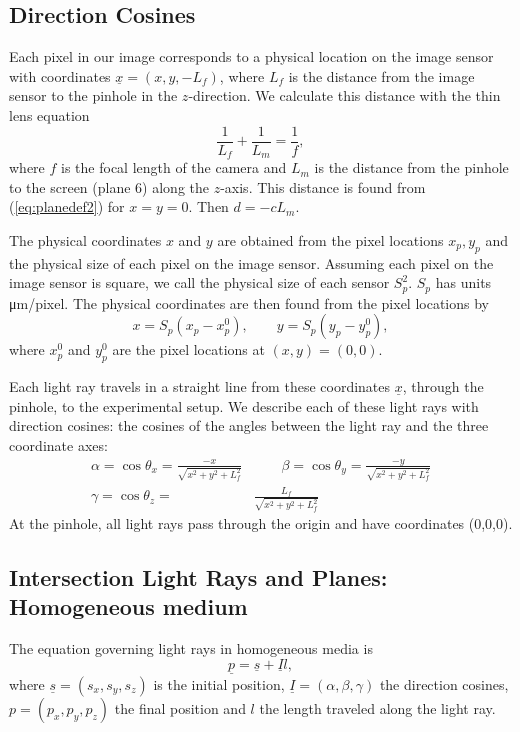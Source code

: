 \documentclass{svjour3}                     %
\begin{document}
\subsection{Direction Cosines}
Each pixel in our image corresponds to a physical location on the image sensor with coordinates $\underline{x} = (x,y, -L_f)$, where $L_f$ is the distance from the image sensor to the pinhole in the $z$-direction. We calculate this distance with the thin lens equation
\begin{equation}
 \frac{1}{L_f} + \frac{1}{L_m} = \frac{1}{f},
\end{equation}
where $f$ is the focal length of the camera and $L_m$ is the distance from the pinhole to the screen (plane 6) along the $z$-axis. This distance is found from (\ref{eq:planedef2}) for $x=y=0$. Then $d = - c L_m$.

The physical coordinates $x$ and $y$ are obtained from the pixel locations $x_p, y_p$  and the physical size of each pixel on the image sensor. Assuming each pixel on the image sensor is square, we call the physical size of each sensor $S_p^2$. $S_p$ has units \si[per-mode=symbol]{\micro\metre\per pixel}. The physical coordinates are then found from the pixel locations by %
\begin{equation}
	x = S_p (x_p-x_p^0), \qquad  y = S_p (y_p-y_p^0),
\end{equation}
where $x_p^0$ and $y_p^0$ are the pixel locations at $(x,y)=(0,0)$.

Each light ray travels in a straight line from these coordinates $\underline{x}$, through the pinhole, to the experimental setup. We describe each of these light rays with direction cosines: the cosines of the angles between the light ray and the three coordinate axes:
\begin{align}
\label{eq:directioncosines}
	\alpha = \cos \theta_x = \frac{-x}{\sqrt{x^2+y^2+L_f^2}} &\qquad
	\beta = \cos \theta_y = \frac{-y}{\sqrt{x^2+y^2+L_f^2}} \\
	\gamma = \cos \theta_z = &\frac{L_f}{\sqrt{x^2+y^2+L_f^2}} \nonumber
\end{align}
At the pinhole, all light rays pass through the origin and have coordinates (0,0,0). %

\subsection{Intersection Light Rays and Planes: Homogeneous medium}
The equation governing light rays in homogeneous media is
\begin{equation}
	\label{eq:linedef}
   \underline{p} = \underline{s} + \underline{I} l,
\end{equation}
where $\underline{s} = (s_x, s_y, s_z)$ is the initial position, $\underline{I} = (\alpha, \beta, \gamma)$ the direction cosines, $p = (p_x, p_y, p_z)$ the final position and $l$ the length traveled along the light ray. %
\end{document}
